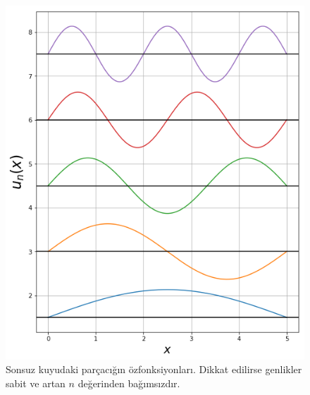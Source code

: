 \documentclass[a4paper,12pt, twoside]{article}
\begin{document}
\begin{enumerate}
	\begin{figure}
	\begin{minipage}{.48\textwidth}
		\centering
		\includegraphics[width=\linewidth]{infinite_well_eigenfunctions.png}
		\caption{Sonsuz kuyudaki parçacığın özfonksiyonları. Dikkat edilirse genlikler sabit ve artan $n$ değerinden bağımsızdır.}
		\label{fig:infinitewell_eigenfunctions}
    \end{minipage}	
    \hspace{12pt}
	\begin{minipage}{.48\textwidth}
	\centering

\end{minipage}
\end{figure}
\end{enumerate}
\end{document}
